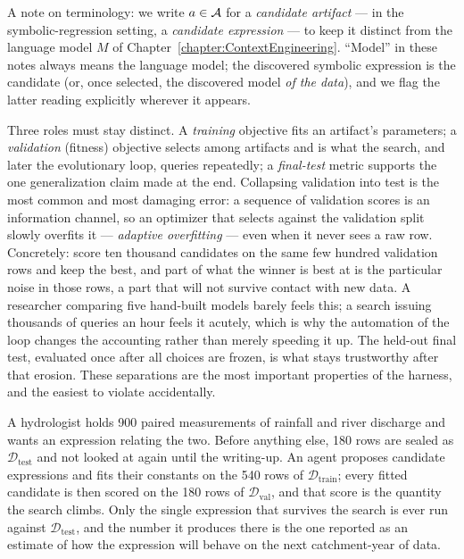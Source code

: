 A note on terminology: we write $a \in \mathcal{A}$ for a \emph{candidate artifact} --- in the symbolic-regression setting, a \emph{candidate expression} --- to keep it distinct from the language model $M$ of Chapter~\ref{chapter:ContextEngineering}.
``Model'' in these notes always means the language model; the discovered symbolic expression is the candidate (or, once selected, the discovered model \emph{of the data}), and we flag the latter reading explicitly wherever it appears.

Three roles must stay distinct.
A \emph{training} objective fits an artifact's parameters; a \emph{validation} (fitness) objective selects among artifacts and is what the search, and later the evolutionary loop, queries repeatedly; a \emph{final-test} metric supports the one generalization claim made at the end.
Collapsing validation into test is the most common and most damaging error: a sequence of validation scores is an information channel, so an optimizer that selects against the validation split slowly overfits it --- \emph{adaptive overfitting} --- even when it never sees a raw row.
Concretely: score ten thousand candidates on the same few hundred validation rows and keep the best, and part of what the winner is best at is the particular noise in those rows, a part that will not survive contact with new data.
A researcher comparing five hand-built models barely feels this; a search issuing thousands of queries an hour feels it acutely, which is why the automation of the loop changes the accounting rather than merely speeding it up.
The held-out final test, evaluated once after all choices are frozen, is what stays trustworthy after that erosion.
These separations are the most important properties of the harness, and the easiest to violate accidentally.

\begin{example}
A hydrologist holds 900 paired measurements of rainfall and river discharge and wants an expression relating the two.
Before anything else, 180 rows are sealed as $\mathcal{D}_{\mathrm{test}}$ and not looked at again until the writing-up.
An agent proposes candidate expressions and fits their constants on the 540 rows of $\mathcal{D}_{\mathrm{train}}$; every fitted candidate is then scored on the 180 rows of $\mathcal{D}_{\mathrm{val}}$, and that score is the quantity the search climbs.
Only the single expression that survives the search is ever run against $\mathcal{D}_{\mathrm{test}}$, and the number it produces there is the one reported as an estimate of how the expression will behave on the next catchment-year of data.
\end{example}

